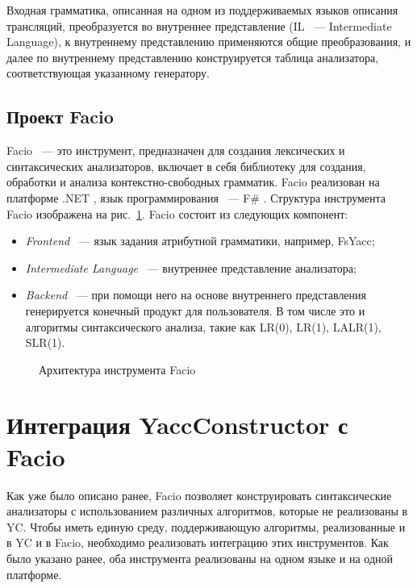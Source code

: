 \documentclass[14pt]{matmex-diploma}
\begin{document}
Входная грамматика, описанная на одном из поддерживаемых языков описания трансляций, преобразуется во внутреннее представление (IL ~--- Intermediate Language), к внутреннему представлению применяются общие преобразования, и далее по внутреннему представлению конструируется таблица анализатора, соответствующая указанному генератору.

\newpage
\subsection{Проект Facio}
Facio ~--- это инструмент, предназначен для создания лексических и синтаксических анализаторов, включает в себя библиотеку для создания, обработки и анализа контекстно-свободных грамматик. Facio реализован на платформе .NET \cite{link:dotNet}, язык программирования ~--- F\# \cite{link:fSharp}. Структура инструмента Facio изображена на рис.~\ref{Facio}.
Facio состоит из следующих компонент:
\begin{itemize}
\item
\textit{Frontend} ~--- язык задания атрибутной грамматики, например, FsYacc;
\item
\textit{Intermediate Language} ~--- внутреннее представление анализатора;
\item
\textit{Backend} ~--- при помощи него на основе внутреннего представления генерируется конечный продукт для пользователя. В том числе это и алгоритмы синтаксического анализа, такие как LR(0), LR(1), LALR(1), SLR(1).
\end{itemize}

\begin{figure}[h]
  \caption{Архитектура инструмента Facio}
  \label{Facio}
\end{figure}


\section{Интеграция YaccConstructor с Facio}
Как уже было описано ранее, Facio позволяет конструировать синтаксические анализаторы с использованием различных алгоритмов, которые не реализованы в YC. Чтобы иметь единую среду, поддерживающую алгоритмы, реализованные и в YC и в Facio, необходимо реализовать интеграцию этих инструментов. Как было указано ранее, оба инструмента реализованы на одном языке и на одной платформе.
\end{document}
